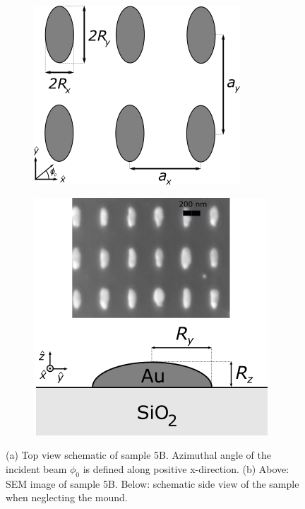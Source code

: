 \begin{figure}
    \begin{subfigure}{0.5\textwidth}
        \centering
        \includegraphics[width=\linewidth]{figures/Ch3/s5b/S5B_topview_phi.png}
        \caption{}
        \label{fig:S5B_schematic_overview_topview}
    \end{subfigure}
    \begin{subfigure}{0.5\textwidth}
        \centering
        \includegraphics[width=0.83\linewidth]{figures/Ch3/s5b/S5B_sideview+SEM.png}
        \caption{}
        \label{fig:S5B_schematic_overview_SEM_sideview}
    \end{subfigure}
    \caption{(a) Top view schematic of sample 5B. Azimuthal angle of the incident beam $\phi_0$ is defined along positive x-direction. (b) Above: SEM image of sample 5B. Below: schematic side view of the sample when neglecting the mound.}
    \label{fig:S5B_schematic_overview}
\end{figure}

